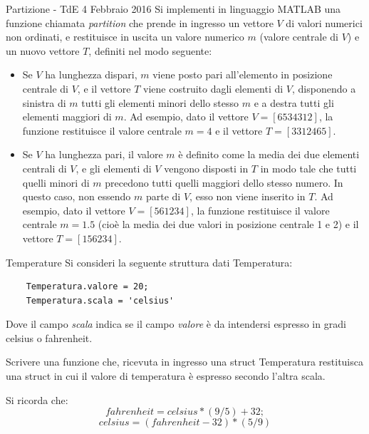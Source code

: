 \documentclass[aspectratio=169, ]{beamer}
\begin{document}
\begin{frame}[allowframebreaks]{Partizione - TdE 4 Febbraio 2016}
    Si implementi in linguaggio MATLAB una funzione chiamata \emph{partition} che prende in ingresso un
    vettore $V$ di valori numerici non ordinati, e restituisce in uscita un valore numerico $m$ (valore
    centrale di $V$) e un nuovo vettore $T$, definiti nel modo seguente:

    \framebreak

    \begin{itemize}
        \item Se $V$ ha lunghezza dispari, $m$ viene posto pari all'elemento in posizione centrale di $V$, e il
            vettore $T$ viene costruito dagli elementi di $V$, disponendo a sinistra di $m$ tutti gli elementi minori
            dello stesso $m$ e a destra tutti gli elementi maggiori di $m$.
            Ad esempio, dato il vettore $V = [6 5 3 4 3 1 2]$, la funzione restituisce il valore centrale $m = 4$ e
            il vettore $T = [ 3 3 1 2 4 6 5]$.

        \item Se $V$ ha lunghezza pari, il valore $m$ è definito come la media dei due elementi centrali di $V$, e gli
            elementi di $V$ vengono disposti in $T$ in modo tale che tutti quelli minori di $m$ precedono tutti
            quelli maggiori dello stesso numero. In questo caso, non essendo $m$ parte di $V$, esso non viene
            inserito in $T$.
            Ad esempio, dato il vettore $V = [5 6 1 2 3 4]$, la funzione restituisce il valore centrale $m = 1.5$
            (cioè la media dei due valori in posizione centrale 1 e 2) e il vettore $T = [1 5 6 2 3 4]$.
    \end{itemize}
\end{frame}

\begin{frame}[fragile]{Temperature}
    Si consideri la seguente struttura dati Temperatura:
    \begin{lstlisting}
    Temperatura.valore = 20;
    Temperatura.scala = 'celsius'
    \end{lstlisting}
    Dove il campo \emph{scala} indica se il campo \emph{valore} è da intendersi espresso in gradi celsius o fahrenheit.

    Scrivere una funzione che, ricevuta in ingresso una struct Temperatura restituisca una struct in cui il valore di temperatura è espresso secondo l'altra scala.

    Si ricorda che: \[fahrenheit = celsius * (9/5) + 32;\] 	\[celsius = (fahrenheit -32) * (5/9)\]
\end{frame}
\end{document}
